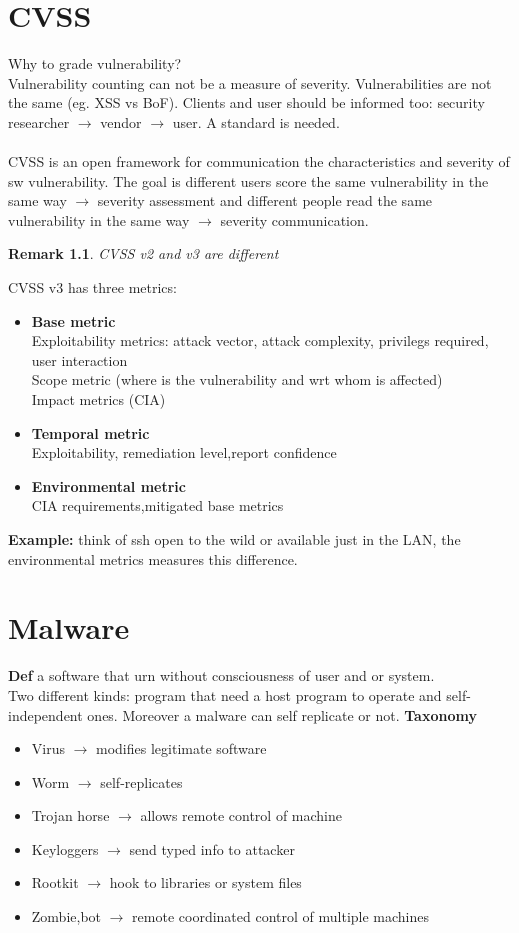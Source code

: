 \documentclass[10pt,a4paper]{book}
\newtheorem{remark}{Remark}
\begin{document}
\chapter{CVSS}
Why to grade vulnerability?\\
Vulnerability counting can not be a measure of severity. Vulnerabilities are not the same (eg. XSS vs BoF). Clients and user should be informed too: security researcher $\to$ vendor $\to$ user. A standard is needed.\\\\
CVSS is an open framework for communication the characteristics and severity of sw vulnerability. The goal is different users score the same vulnerability in the same way $\to$ severity assessment and different people read the same vulnerability in the same way $\to$ severity communication.\\
\begin{remark}
CVSS v2 and v3 are different
\end{remark}
CVSS v3 has three metrics:
\begin{itemize}
\item \textbf{Base metric}\\
Exploitability metrics: attack vector, attack complexity, privilegs required, user interaction\\
Scope metric (where is the vulnerability and wrt whom is affected)\\
Impact metrics (CIA)
\item \textbf{Temporal metric}\\
Exploitability, remediation level,report confidence
\item \textbf{Environmental metric}\\
CIA requirements,mitigated base metrics
\end{itemize}
\textbf{Example:} think of ssh open to the wild or available just in the LAN, the environmental metrics measures this difference.\\
\chapter{Malware}
\textbf{Def} a software that urn without consciousness of user and or system.\\
Two different kinds: program that need a host program to operate and self-independent ones. Moreover a malware can self replicate or not.
\textbf{Taxonomy}
\begin{itemize}
\item Virus $\to$ modifies legitimate software
\item Worm $\to$ self-replicates
\item Trojan horse $\to$ allows remote control of machine
\item Keyloggers $\to$ send typed info to attacker
\item Rootkit $\to$ hook to libraries or system files
\item Zombie,bot $\to$ remote coordinated control of multiple machines
\end{itemize}
\end{document}

